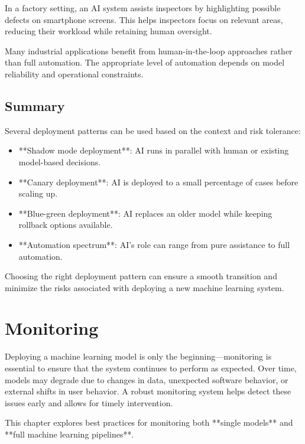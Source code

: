 \documentclass[12pt,openany]{book}
\begin{document}
\begin{examplebox}
   In a factory setting, an AI system assists inspectors by highlighting possible defects on smartphone screens. This helps inspectors focus on relevant areas, reducing their workload while retaining human oversight.
\end{examplebox}

Many industrial applications benefit from human-in-the-loop approaches rather than full automation. The appropriate level of automation depends on model reliability and operational constraints.

\section{Summary}

Several deployment patterns can be used based on the context and risk tolerance:

\begin{itemize}
    \item **Shadow mode deployment**: AI runs in parallel with human or existing model-based decisions.
    \item **Canary deployment**: AI is deployed to a small percentage of cases before scaling up.
    \item **Blue-green deployment**: AI replaces an older model while keeping rollback options available.
    \item **Automation spectrum**: AI’s role can range from pure assistance to full automation.
\end{itemize}

Choosing the right deployment pattern can ensure a smooth transition and minimize the risks associated with deploying a new machine learning system.



\chapter{Monitoring}

Deploying a machine learning model is only the beginning—monitoring is essential to ensure that the system continues to perform as expected. Over time, models may degrade due to changes in data, unexpected software behavior, or external shifts in user behavior. A robust monitoring system helps detect these issues early and allows for timely intervention.

This chapter explores best practices for monitoring both **single models** and **full machine learning pipelines**.
\end{document}

